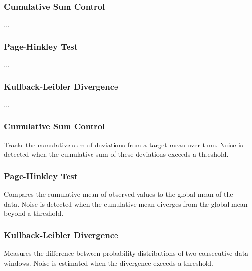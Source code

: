 \subsubsection{Cumulative Sum Control}
...

\subsubsection{Page-Hinkley Test}
...

\subsubsection{Kullback-Leibler Divergence}
...








\subsubsection{Cumulative Sum Control}
Tracks the cumulative sum of deviations from a target mean over time. Noise is detected when the cumulative sum of these deviations exceeds a threshold.

\subsubsection{Page-Hinkley Test}
Compares the cumulative mean of observed values to the global mean of the data. Noise is detected when the cumulative mean diverges from the global mean beyond a threshold.

\subsubsection{Kullback-Leibler Divergence}
Measures the difference between probability distributions of two consecutive data windows. Noise is estimated when the divergence exceeds a threshold.







